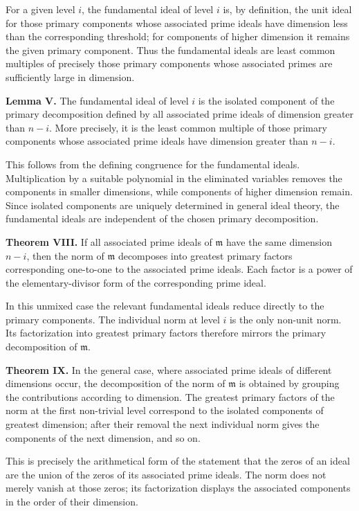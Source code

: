 \documentclass[11pt]{article}
\begin{document}
For a given level $i$, the fundamental ideal of level $i$ is, by definition, the unit ideal for those primary components whose associated prime ideals have dimension less than the corresponding threshold; for components of higher dimension it remains the given primary component. Thus the fundamental ideals are least common multiples of precisely those primary components whose associated primes are sufficiently large in dimension.

\textbf{Lemma V.} The fundamental ideal of level $i$ is the isolated component of the primary decomposition defined by all associated prime ideals of dimension greater than $n-i$. More precisely, it is the least common multiple of those primary components whose associated prime ideals have dimension greater than $n-i$.

This follows from the defining congruence for the fundamental ideals. Multiplication by a suitable polynomial in the eliminated variables removes the components in smaller dimensions, while components of higher dimension remain. Since isolated components are uniquely determined in general ideal theory, the fundamental ideals are independent of the chosen primary decomposition.

\textbf{Theorem VIII.} If all associated prime ideals of $\mathfrak m$ have the same dimension $n-i$, then the norm of $\mathfrak m$ decomposes into greatest primary factors corresponding one-to-one to the associated prime ideals. Each factor is a power of the elementary-divisor form of the corresponding prime ideal.

In this unmixed case the relevant fundamental ideals reduce directly to the primary components. The individual norm at level $i$ is the only non-unit norm. Its factorization into greatest primary factors therefore mirrors the primary decomposition of $\mathfrak m$.

\textbf{Theorem IX.} In the general case, where associated prime ideals of different dimensions occur, the decomposition of the norm of $\mathfrak m$ is obtained by grouping the contributions according to dimension. The greatest primary factors of the norm at the first non-trivial level correspond to the isolated components of greatest dimension; after their removal the next individual norm gives the components of the next dimension, and so on.

This is precisely the arithmetical form of the statement that the zeros of an ideal are the union of the zeros of its associated prime ideals. The norm does not merely vanish at those zeros; its factorization displays the associated components in the order of their dimension.
\end{document}
